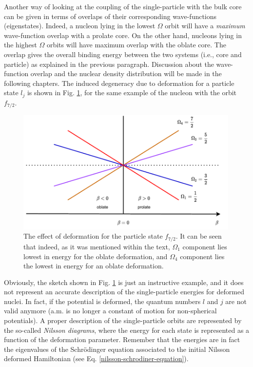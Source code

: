Another way of looking at the coupling of the single-particle with the bulk core can be given in terms of overlaps of their corresponding wave-functions (eigenstates). Indeed, a nucleon lying in the lowest $\Omega$ orbit will have a \emph{maximum} wave-function overlap with a prolate core. On the other hand, nucleons lying in the highest $\Omega$ orbits will have maximum overlap with the oblate core. The overlap gives the overall binding energy between the two systems (i.e., core and particle) as explained in the previous paragraph. Discussion about the wave-function overlap and the nuclear density distribution \cite{frauendorf2014transverse, das2018nuclear} will be made in the following chapters. The induced degeneracy due to deformation for a particle state $l_j$ is shown in Fig. \ref{nillson-orbits-splittings}, for the same example of the nucleon with the orbit $f_{7/2}$.
\begin{figure}
    \centering
    \includegraphics[width=0.99\textwidth]{Chapters/Figures/nillson_SP_splittings.pdf}
    \caption{The effect of deformation for the particle state $f_{7/2}$. It can be seen that indeed, as it was mentioned within the text, $\Omega_1$ component lies lowest in energy for the oblate deformation, and $\Omega_4$ component lies the lowest in energy for an oblate deformation.}
    \label{nillson-orbits-splittings}
\end{figure}

Obviously, the sketch shown in Fig. \ref{nillson-orbits-splittings} is just an instructive example, and it does not represent an accurate description of the single-particle energies for deformed nuclei. In fact, if the potential is deformed, the quantum numbers $l$ and $j$ are not valid anymore (a.m. is no longer a constant of motion for non-spherical potentials). A proper description of the single-particle orbits are represented by the so-called \emph{Nilsson diagrams}, where the energy for each state is represented as a function of the deformation parameter. Remember that the energies are in fact the eigenvalues of the Schrödinger equation associated to the initial Nilsson deformed Hamiltonian (see Eq. \ref{nilsson-schrodiner-equation}).

